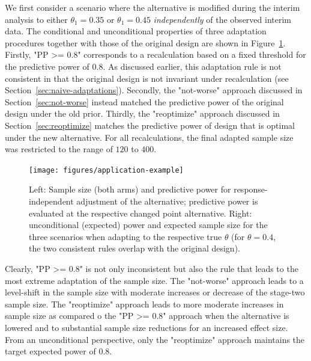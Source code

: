 \documentclass[12pt]{article}
\begin{document}
We first consider a scenario where the alternative is modified during the interim analysis to either $\theta_1=0.35$ or $\theta_1=0.45$ \emph{independently} of the
observed interim data.
The conditional and unconditional properties of three adaptation procedures together with those of the original design are shown in Figure~\ref{fig:application-example-1}.
Firstly, "PP >= 0.8" corresponds to a recalculation based on a fixed threshold for the predictive power of $0.8$.
As discussed earlier, this adaptation rule is not consistent in that the original design is not invariant under recalculation (see Section~\ref{sec:naive-adaptations}).
Secondly, the "not-worse" approach discussed in Section~\ref{sec:not-worse} instead matched the predictive power of the original design under the old prior.
Thirdly, the "reoptimize" approach discussed in Section~\ref{sec:reoptimize} matches the predictive power of design that is optimal under the new alternative.
For all recalculations, the final adapted sample size was restricted to the range of $120$ to $400$.
\begin{figure}
    \centering
    \texttt{[image: figures/application-example]}
    \caption{%
        Left: Sample size (both arms) and predictive power for response-independent adjustment of the alternative; predictive power is evaluated at the respective changed point alternative.
        Right: unconditional (expected) power and expected sample size for the three scenarios when adapting to the respective true $\theta$ (for $\theta=0.4$, the two consistent rules overlap with the original design).
    }
    \label{fig:application-example-1}
\end{figure}
Clearly, "PP >= 0.8" is not only inconsistent but also the rule that leads to the most extreme adaptation of the sample size.
The "not-worse" approach leads to a level-shift in the sample size with moderate
increases or decrease of the stage-two sample size.
The "reoptimize" approach leads to more moderate increases in sample size
as compared o the "PP >= 0.8" approach when the alternative is lowered and to substantial sample size reductions for an increased effect size.
From an unconditional perspective, only the "reoptimize" approach maintains the target expected power of $0.8$.
\end{document}
